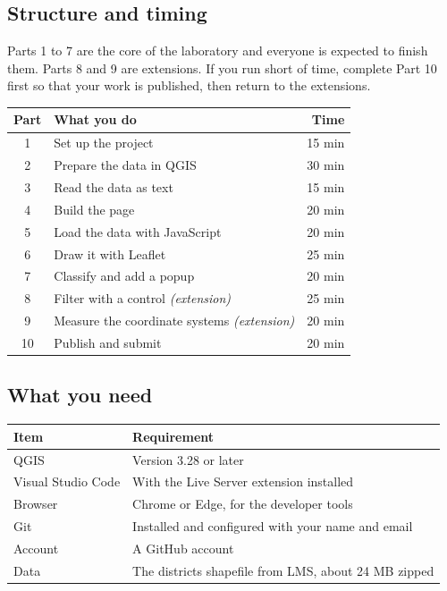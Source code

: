 \documentclass{article}
\begin{document}
\subsection{Structure and timing}

Parts 1 to 7 are the core of the laboratory and everyone is expected to
finish them. Parts 8 and 9 are extensions. If you run short of time,
complete Part 10 first so that your work is published, then return to
the extensions.

\vspace{.6em}
\begin{tabularx}{\textwidth}{@{}c X r@{}}
\toprule
\textbf{Part} & \textbf{What you do} & \textbf{Time} \\
\midrule
1  & Set up the project                          & 15 min \\
2  & Prepare the data in QGIS                    & 30 min \\
3  & Read the data as text                       & 15 min \\
4  & Build the page                              & 20 min \\
5  & Load the data with JavaScript               & 20 min \\
6  & Draw it with Leaflet                        & 25 min \\
7  & Classify and add a popup                    & 20 min \\
\midrule
8  & Filter with a control \textit{(extension)}  & 25 min \\
9  & Measure the coordinate systems \textit{(extension)} & 20 min \\
\midrule
10 & Publish and submit                          & 20 min \\
\bottomrule
\end{tabularx}

\subsection{What you need}

\begin{tabularx}{\textwidth}{@{}L{4.2cm} X@{}}
\toprule
\textbf{Item} & \textbf{Requirement} \\
\midrule
QGIS            & Version 3.28 or later \\
Visual Studio Code & With the Live Server extension installed \\
Browser         & Chrome or Edge, for the developer tools \\
Git             & Installed and configured with your name and email \\
Account         & A GitHub account \\
Data            & The districts shapefile from LMS, about 24 MB zipped \\
\bottomrule
\end{tabularx}
\end{document}
